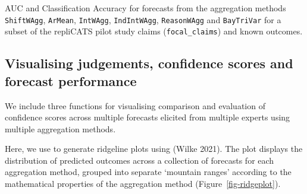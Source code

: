 \documentclass[
  11pt,
  a4paper,
]{article}
\begin{document}
\begin{table}[H]

\caption{\label{tbl-multi-method-workflow-eval}AUC and Classification
Accuracy for forecasts from the aggregation methods \texttt{ShiftWAgg},
\texttt{ArMean}, \texttt{IntWAgg}, \texttt{IndIntWAgg},
\texttt{ReasonWAgg} and \texttt{BayTriVar} for a subset of the repliCATS
pilot study claims (\texttt{focal\_claims}) and known outcomes.}


\end{table}%

\subsection{Visualising judgements, confidence scores and forecast
performance}\label{visualising-judgements-confidence-scores-and-forecast-performance}

We include three functions for visualising comparison and evaluation of
confidence scores across multiple forecasts elicited from multiple
experts using multiple aggregation methods.

Here, we use  to generate ridgeline
plots using  (Wilke 2021). The plot displays the
distribution of predicted outcomes across a collection of forecasts for
each aggregation method, grouped into separate `mountain ranges'
according to the mathematical properties of the aggregation method
(Figure~\ref{fig-ridgeplot}).
\end{document}

